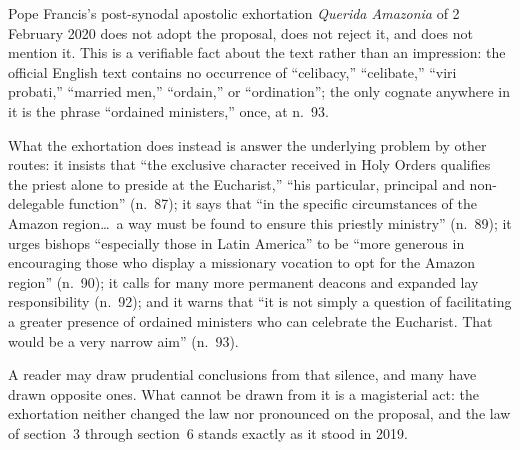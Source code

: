 Pope Francis's post-synodal apostolic exhortation \emph{Querida Amazonia} of 2 February 2020 does not adopt the proposal, does not reject it, and does not mention it. This is a verifiable fact about the text rather than an impression: the official English text contains no occurrence of ``celibacy,'' ``celibate,'' ``viri probati,'' ``married men,'' ``ordain,'' or ``ordination''; the only cognate anywhere in it is the phrase ``ordained ministers,'' once, at n.~93.

What the exhortation does instead is answer the underlying problem by other routes: it insists that ``the exclusive character received in Holy Orders qualifies the priest alone to preside at the Eucharist,'' ``his particular, principal and non-delegable function'' (n.~87); it says that ``in the specific circumstances of the Amazon region\ldots\ a way must be found to ensure this priestly ministry'' (n.~89); it urges bishops ``especially those in Latin America'' to be ``more generous in encouraging those who display a missionary vocation to opt for the Amazon region'' (n.~90); it calls for many more permanent deacons and expanded lay responsibility (n.~92); and it warns that ``it is not simply a question of facilitating a greater presence of ordained ministers who can celebrate the Eucharist. That would be a very narrow aim'' (n.~93).

A reader may draw prudential conclusions from that silence, and many have drawn opposite ones. What cannot be drawn from it is a magisterial act: the exhortation neither changed the law nor pronounced on the proposal, and the law of section~3 through section~6 stands exactly as it stood in 2019.
